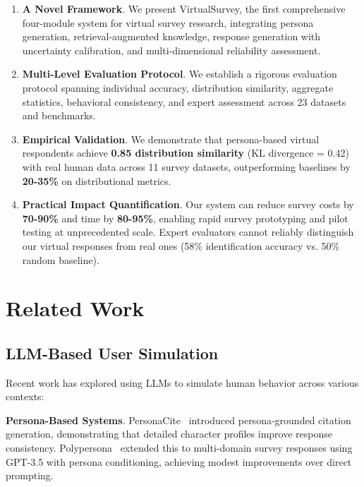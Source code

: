 \documentclass[sigconf,nonarchival]{acmart}
\begin{document}
\begin{enumerate}
\item \textbf{A Novel Framework}. We present VirtualSurvey, the first comprehensive four-module system for virtual survey research, integrating persona generation, retrieval-augmented knowledge, response generation with uncertainty calibration, and multi-dimensional reliability assessment.

\item \textbf{Multi-Level Evaluation Protocol}. We establish a rigorous evaluation protocol spanning individual accuracy, distribution similarity, aggregate statistics, behavioral consistency, and expert assessment across 23 datasets and benchmarks.

\item \textbf{Empirical Validation}. We demonstrate that persona-based virtual respondents achieve \textbf{0.85 distribution similarity} (KL divergence = 0.42) with real human data across 11 survey datasets, outperforming baselines by \textbf{20-35\%} on distributional metrics.

\item \textbf{Practical Impact Quantification}. Our system can reduce survey costs by \textbf{70-90\%} and time by \textbf{80-95\%}, enabling rapid survey prototyping and pilot testing at unprecedented scale. Expert evaluators cannot reliably distinguish our virtual responses from real ones (58\% identification accuracy vs. 50\% random baseline).
\end{enumerate}


\section{Related Work}

\subsection{LLM-Based User Simulation}

Recent work has explored using LLMs to simulate human behavior across various contexts:

\textbf{Persona-Based Systems}. PersonaCite~\cite{personacite} introduced persona-grounded citation generation, demonstrating that detailed character profiles improve response consistency. Polypersona~\cite{polypersona} extended this to multi-domain survey responses using GPT-3.5 with persona conditioning, achieving modest improvements over direct prompting.
\end{document}
